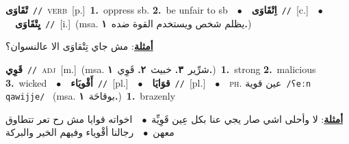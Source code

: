\documentclass[10pt,a4paper,twoside]{article} %
\begin{document}
\begin{multicols}{2}
{\setlength\topsep{0pt}\textbf{\foreignlanguage{arabic}{تْقَاوَى}}\ {\color{gray}\texttt{//}\color{black}}\ \textsc{verb}\ [p.]\ \textbf{1.}~oppress sb.  \textbf{2.}~be unfair to sb\ \ $\bullet$\ \ \setlength\topsep{0pt}\textbf{\foreignlanguage{arabic}{اِتْقَاوَى}}\ {\color{gray}\texttt{//}\color{black}}\ [c.]\ \ $\bullet$\ \ \setlength\topsep{0pt}\textbf{\foreignlanguage{arabic}{يِتْقَاوَى}}\ {\color{gray}\texttt{//}\color{black}}\ [i.]\ \color{gray}(msa. \foreignlanguage{arabic}{يظلم شخص ويستخدم القوة ضده}~\foreignlanguage{arabic}{\textbf{١.}})\color{black}\  \begin{flushright}\color{gray}\foreignlanguage{arabic}{\textbf{\underline{\foreignlanguage{arabic}{أمثلة}}}: مش جاي تِتْقاوَى الا عالنسوان؟}\end{flushright}\color{black}} \vspace{2mm}

{\setlength\topsep{0pt}\textbf{\foreignlanguage{arabic}{قَوِي}}\ {\color{gray}\texttt{//}\color{black}}\ \textsc{adj}\ [m.]\ \color{gray}(msa. \foreignlanguage{arabic}{شرِّير}~\foreignlanguage{arabic}{\textbf{٣.}}  \foreignlanguage{arabic}{خبيث}~\foreignlanguage{arabic}{\textbf{٢.}}  \foreignlanguage{arabic}{قَوِي}~\foreignlanguage{arabic}{\textbf{١.}})\color{black}\ \textbf{1.}~strong  \textbf{2.}~malicious  \textbf{3.}~wicked\ \ $\bullet$\ \ \setlength\topsep{0pt}\textbf{\foreignlanguage{arabic}{أَقْويَاء}}\ {\color{gray}\texttt{//}\color{black}}\ [pl.]\ \ $\bullet$\ \ \setlength\topsep{0pt}\textbf{\foreignlanguage{arabic}{قوَايَا}}\ {\color{gray}\texttt{//}\color{black}}\ [pl.]\ \ $\bullet$\ \ \textsc{ph.} \color{gray} \foreignlanguage{arabic}{عين قوية}\color{black}\ {\color{gray}\texttt{/{\sffamily ʕeːn qawijje}/}\color{black}}\ \color{gray} (msa. \foreignlanguage{arabic}{بوقاحَة}~\foreignlanguage{arabic}{\textbf{١.}})\color{black}\ \textbf{1.}~brazenly\  \begin{flushright}\color{gray}\foreignlanguage{arabic}{\textbf{\underline{\foreignlanguage{arabic}{أمثلة}}}: لا وأحلى اشي صار يجي عنا بكل عِين قَوِيِّة\ $\bullet$\ \  اخواته قوايا مش رح تعر تتطاوق معهن\ $\bullet$\ \  رجالنا أقْوياء وفيهم الخير والبركة}\end{flushright}\color{black}} \vspace{2mm}


\end{multicols}
\end{document}
